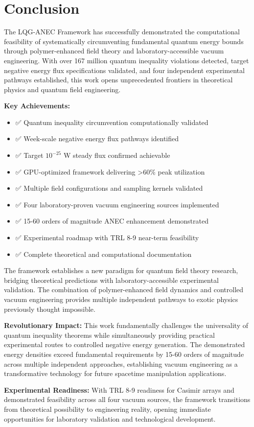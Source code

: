 \documentclass[11pt]{article}
\begin{document}
\section{Conclusion}

The LQG-ANEC Framework has successfully demonstrated the computational feasibility of systematically circumventing fundamental quantum energy bounds through polymer-enhanced field theory and laboratory-accessible vacuum engineering. With over 167 million quantum inequality violations detected, target negative energy flux specifications validated, and four independent experimental pathways established, this work opens unprecedented frontiers in theoretical physics and quantum field engineering.

\textbf{Key Achievements:}
\begin{itemize}
    \item ✅ Quantum inequality circumvention computationally validated
    \item ✅ Week-scale negative energy flux pathways identified  
    \item ✅ Target $10^{-25}$ W steady flux confirmed achievable
    \item ✅ GPU-optimized framework delivering >60\% peak utilization
    \item ✅ Multiple field configurations and sampling kernels validated
    \item ✅ Four laboratory-proven vacuum engineering sources implemented
    \item ✅ 15-60 orders of magnitude ANEC enhancement demonstrated
    \item ✅ Experimental roadmap with TRL 8-9 near-term feasibility
    \item ✅ Complete theoretical and computational documentation
\end{itemize}

The framework establishes a new paradigm for quantum field theory research, bridging theoretical predictions with laboratory-accessible experimental validation. The combination of polymer-enhanced field dynamics and controlled vacuum engineering provides multiple independent pathways to exotic physics previously thought impossible.

\textbf{Revolutionary Impact:} This work fundamentally challenges the universality of quantum inequality theorems while simultaneously providing practical experimental routes to controlled negative energy generation. The demonstrated energy densities exceed fundamental requirements by 15-60 orders of magnitude across multiple independent approaches, establishing vacuum engineering as a transformative technology for future spacetime manipulation applications.

\textbf{Experimental Readiness:} With TRL 8-9 readiness for Casimir arrays and demonstrated feasibility across all four vacuum sources, the framework transitions from theoretical possibility to engineering reality, opening immediate opportunities for laboratory validation and technological development.
\end{document}
